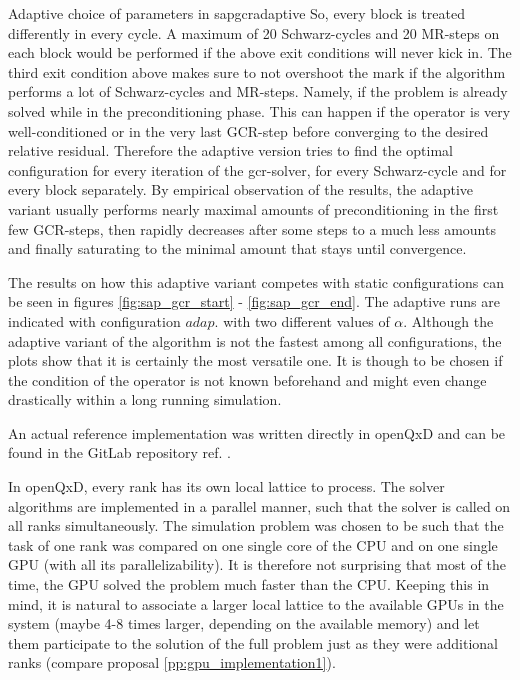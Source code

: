 \documentclass{article}
\theoremstyle{plain} %
\theoremstyle{convention} %
\theoremstyle{remark} %
\numberwithin{equation}{section}
\begin{document}
\begin{proposal}{Adaptive choice of parameters in \acrshort{sapgcr}}{adaptive}
So, every block is treated differently in every cycle. A maximum of \num{20} Schwarz-cycles and \num{20} MR-steps on each block would be performed if the above exit conditions will never kick in. The third exit condition above makes sure to not overshoot the mark if the algorithm performs a lot of Schwarz-cycles and MR-steps. Namely, if the problem is already solved while in the preconditioning phase. This can happen if the operator is very well-conditioned or in the very last GCR-step before converging to the desired relative residual. Therefore the adaptive version tries to find the optimal configuration for every iteration of the \acrshort{gcr}-solver, for every Schwarz-cycle and for every block separately. By empirical observation of the results, the adaptive variant usually performs nearly maximal amounts of preconditioning in the first few GCR-steps, then rapidly decreases after some steps to a much less amounts and finally saturating to the minimal amount that stays until convergence.

The results on how this adaptive variant competes with static configurations can be seen in figures \ref{fig:sap_gcr_start} - \ref{fig:sap_gcr_end}. The adaptive runs are indicated with configuration $adap.$ with two different values of $\alpha$. Although the adaptive variant of the algorithm is not the fastest among all configurations, the plots show that it is certainly the most versatile one. It is though to be chosen if the condition of the operator is not known beforehand and might even change drastically within a long running simulation.

An actual reference implementation was written directly in openQxD and can be found in the GitLab repository ref. \cite{gitlab_adaptive}.

\end{proposal}

In openQxD, every rank has its own local lattice to process. The solver algorithms are implemented in a parallel manner, such that the solver is called on all ranks simultaneously. The simulation problem was chosen to be such that the task of one rank was compared on one single core of the CPU and on one single GPU (with all its parallelizability). It is therefore not surprising that most of the time, the GPU solved the problem much faster than the CPU. Keeping this in mind, it is natural to associate a larger local lattice to the available GPUs in the system (maybe 4-8 times larger, depending on the available memory) and let them participate to the solution of the full problem just as they were additional ranks (compare proposal \ref{pp:gpu_implementation1}).
\end{document}
